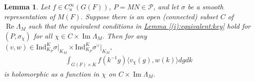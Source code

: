 \documentclass[10pt]{amsart}
\newtheorem{lemma}[theorem]{Lemma}
\theoremstyle{definition}
\numberwithin{equation}{section}
\numberwithin{equation}{subsection}
\newcommand{\Ind}{\mathrm{Ind}}
\renewcommand{\Im}{\mathop{\mathrm{Im}}}
\renewcommand{\Re}{\mathop{\mathrm{Re}}}
\begin{document}

\begin{lemma}\label{lem:zeta:holomorphic} Let $f\in C^\infty_u(G(F))$, $P=MN\in \mathcal{P}$, and let $\sigma$ be a smooth representation of $M(F).$ Suppose there is an open (connected) subset $C$ of $\Re\Lambda_M$ such that the equivalent conditions in \hyperref[(i):equivalent:key]{Lemma \ref{(i):equivalent:key}} hold for $(P,\sigma_\chi)$ for all $\chi\in C\times \Im\Lambda_M.$ Then for any $(v,w)\in \Ind_{K_P }^K\sigma\vert_{K_M }\times\Ind_{K_P }^K\sigma^\vee\vert_{K_M },$
\begin{align*}
            \int_{G(F)\times K}f(k^{-1}g)\langle v_{\chi}(g),w(k)\rangle dgdk
\end{align*}
is holomorphic as a function in $\chi$ on $C\times \Im\Lambda_M.$
\end{lemma}
\end{document}
